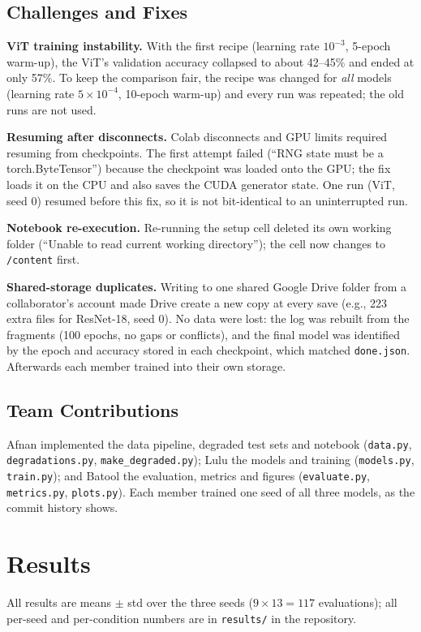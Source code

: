 \documentclass[conference]{IEEEtran}
\begin{document}
\subsection{Challenges and Fixes}
\textbf{ViT training instability.} With the first recipe (learning rate $10^{-3}$, 5-epoch warm-up), the ViT's validation accuracy collapsed to about 42--45\% and ended at only 57\%. To keep the comparison fair, the recipe was changed for \emph{all} models (learning rate $5\times10^{-4}$, 10-epoch warm-up) and every run was repeated; the old runs are not used.

\textbf{Resuming after disconnects.} Colab disconnects and GPU limits required resuming from checkpoints. The first attempt failed (``RNG state must be a torch.ByteTensor'') because the checkpoint was loaded onto the GPU; the fix loads it on the CPU and also saves the CUDA generator state. One run (ViT, seed 0) resumed before this fix, so it is not bit-identical to an uninterrupted run.

\textbf{Notebook re-execution.} Re-running the setup cell deleted its own working folder (``Unable to read current working directory''); the cell now changes to \texttt{/content} first.

\textbf{Shared-storage duplicates.} Writing to one shared Google Drive folder from a collaborator's account made Drive create a new copy at every save (e.g., 223 extra files for ResNet-18, seed 0). No data were lost: the log was rebuilt from the fragments (100 epochs, no gaps or conflicts), and the final model was identified by the epoch and accuracy stored in each checkpoint, which matched \texttt{done.json}. Afterwards each member trained into their own storage.

\subsection{Team Contributions}
Afnan implemented the data pipeline, degraded test sets and notebook (\texttt{data.py}, \texttt{degradations.py}, \texttt{make\_degraded.py}); Lulu the models and training (\texttt{models.py}, \texttt{train.py}); and Batool the evaluation, metrics and figures (\texttt{evaluate.py}, \texttt{metrics.py}, \texttt{plots.py}). Each member trained one seed of all three models, as the commit history shows.

\section{Results}
All results are means $\pm$ std over the three seeds ($9 \times 13 = 117$ evaluations); all per-seed and per-condition numbers are in \texttt{results/} in the repository.
\end{document}

